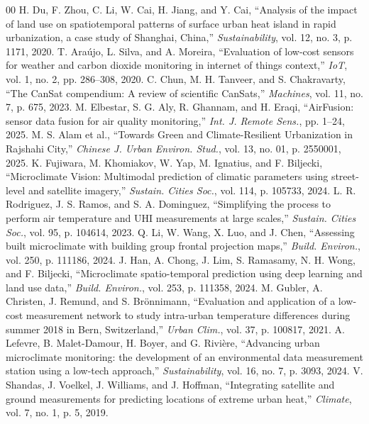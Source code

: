 \documentclass[conference]{IEEEtran}
\begin{document}
\begin{thebibliography}{00}
 H. Du, F. Zhou, C. Li, W. Cai, H. Jiang, and Y. Cai, ``Analysis of the impact of land use on spatiotemporal patterns of surface urban heat island in rapid urbanization, a case study of Shanghai, China,'' \textit{Sustainability}, vol. 12, no. 3, p. 1171, 2020.
 T. Ara\'{u}jo, L. Silva, and A. Moreira, ``Evaluation of low-cost sensors for weather and carbon dioxide monitoring in internet of things context,'' \textit{IoT}, vol. 1, no. 2, pp. 286--308, 2020.
 C. Chun, M. H. Tanveer, and S. Chakravarty, ``The CanSat compendium: A review of scientific CanSats,'' \textit{Machines}, vol. 11, no. 7, p. 675, 2023.
 M. Elbestar, S. G. Aly, R. Ghannam, and H. Eraqi, ``AirFusion: sensor data fusion for air quality monitoring,'' \textit{Int. J. Remote Sens.}, pp. 1--24, 2025.
 M. S. Alam et al., ``Towards Green and Climate-Resilient Urbanization in Rajshahi City,'' \textit{Chinese J. Urban Environ. Stud.}, vol. 13, no. 01, p. 2550001, 2025.
 K. Fujiwara, M. Khomiakov, W. Yap, M. Ignatius, and F. Biljecki, ``Microclimate Vision: Multimodal prediction of climatic parameters using street-level and satellite imagery,'' \textit{Sustain. Cities Soc.}, vol. 114, p. 105733, 2024.
 L. R. Rodriguez, J. S. Ramos, and S. A. Dominguez, ``Simplifying the process to perform air temperature and UHI measurements at large scales,'' \textit{Sustain. Cities Soc.}, vol. 95, p. 104614, 2023.
 Q. Li, W. Wang, X. Luo, and J. Chen, ``Assessing built microclimate with building group frontal projection maps,'' \textit{Build. Environ.}, vol. 250, p. 111186, 2024.
 J. Han, A. Chong, J. Lim, S. Ramasamy, N. H. Wong, and F. Biljecki, ``Microclimate spatio-temporal prediction using deep learning and land use data,'' \textit{Build. Environ.}, vol. 253, p. 111358, 2024.
 M. Gubler, A. Christen, J. Remund, and S. Br\"{o}nnimann, ``Evaluation and application of a low-cost measurement network to study intra-urban temperature differences during summer 2018 in Bern, Switzerland,'' \textit{Urban Clim.}, vol. 37, p. 100817, 2021.
 A. Lefevre, B. Malet-Damour, H. Boyer, and G. Rivi\`{e}re, ``Advancing urban microclimate monitoring: the development of an environmental data measurement station using a low-tech approach,'' \textit{Sustainability}, vol. 16, no. 7, p. 3093, 2024.
 V. Shandas, J. Voelkel, J. Williams, and J. Hoffman, ``Integrating satellite and ground measurements for predicting locations of extreme urban heat,'' \textit{Climate}, vol. 7, no. 1, p. 5, 2019.

\end{thebibliography}
\end{document}

